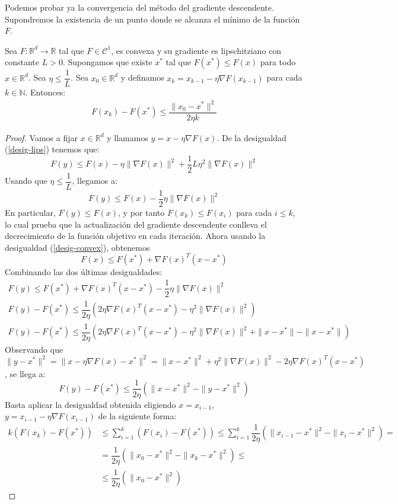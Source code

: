 Podemos probar ya la convergencia del método del gradiente descendente. Supondremos la existencia de un punto donde se alcanza el mínimo de la función $F$. 
\begin{prop} \label{prop:convergencia_grad_desc}
	Sea $F \colon \mathbb{R}^d \to \mathbb{R}$ tal que $F \in \mathcal{C}^1$, es convexa y su gradiente es lipschitziano con constante $L>0$. Supongamos que existe $x^*$ tal que $F(x^*) \leq F(x)$ para todo $x \in \mathbb{R}^d$. Sea $\eta \leq \dfrac{1}{L}$. Sea $x_0 \in \mathbb{R}^d$ y definamos $x_k = x_{k-1} - \eta \nabla F(x_{k-1})$ para cada $k \in \mathbb{N}$. Entonces:
	\begin{align*}
		F(x_k) - F(x^*) \leq \dfrac{\| x_0 - x^* \|^2}{2 \eta k}
	\end{align*} 
\end{prop}

\begin{proof}
	Vamos a fijar $x \in \mathbb{R}^d$ y llamamos $y = x - \eta \nabla F(x)$. De la desigualdad (\ref{desig-lips}) tenemos que:
	$$ F(y) \leq F(x) - \eta \| \nabla F(x) \|^2 + \dfrac{1}{2} L \eta^2 \| \nabla F(x) \|^2 $$
	Usando que $\eta \leq \dfrac{1}{L}$, llegamos a:
	$$ F(y) \leq F(x) - \dfrac{1}{2} \eta \| \nabla F(x) \|^2 $$
	En particular, $F(y) \leq F(x)$, y por tanto $F(x_k) \leq F(x_i)$ para cada $i \leq k$, lo cual prueba que la actualización del gradiente descendente conlleva el decrecimiento de la función objetivo en cada iteración. Ahora usando la desigualdad (\ref{desig-convex}), obtenemos
	$$ F(x) \leq F(x^*) + \nabla F(x)^T (x-x^*)$$
	Combinando las dos últimas desigualdades:
	\begin{gather*}
		F(y)  \leq F(x^*) + \nabla F(x)^T (x-x^*) - \dfrac{1}{2} \eta \| \nabla F(x) \|^2\\
		F(y) - F(x^*) \leq \dfrac{1}{2 \eta} \left( 2 \eta \nabla F(x)^T (x-x^*) - \eta^2 \| \nabla F(x) \|^2 \right)\\
		F(y) - F(x^*) \leq \dfrac{1}{2 \eta} \left( 2 \eta \nabla F(x)^T (x-x^*) - \eta^2 \| \nabla F(x) \|^2 + \| x - x^*\| - \| x - x^*\| \right)
	\end{gather*}
	Observando que $\| y - x^* \|^2 = \| x - \eta \nabla F(x) - x^* \|^2 = \| x - x^*\|^2 + \eta^2 \| \nabla F(x) \|^2 - 2 \eta \nabla F(x)^T (x - x^*)$, se llega a:
	$$ F(y) - F(x^*) \leq \dfrac{1}{2 \eta } \left( \| x - x^*\|^2 - \| y - x^*\|^2 \right) $$
	Basta aplicar la desigualdad obtenida eligiendo $x = x_{i-1}$, $y = x_{i-1} - \eta \nabla F(x_{i-1}) $ de la siguiente forma:
	\begin{align*}
		k \left( F(x_k) - F(x^*) \right) & \leq  \sum_{i=1}^{k} \left( F(x_i) - F(x^*) \right) \leq \sum_{i=1}^{k} \dfrac{1}{2 \eta } \left( \| x_{i-1} - x^*\|^2 - \| x_i - x^*\|^2 \right) = \\
		& = \dfrac{1}{2 \eta } \left( \| x_0 - x^*\|^2 - \| x_k - x^*\|^2 \right) \leq \\
		& \leq \dfrac{1}{2 \eta } \left( \| x_0 - x^*\|^2 \right)
	\end{align*}
\end{proof}

